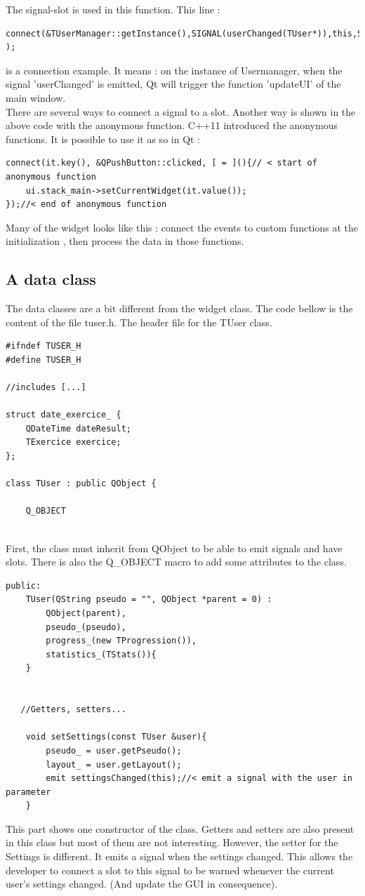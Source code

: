 The signal-slot is used in this function. This line : 
\begin{lstlisting}
connect(&TUserManager::getInstance(),SIGNAL(userChanged(TUser*)),this,SLOT(updateUI(TUser*)) );
\end{lstlisting}
is a connection example. It means : on the instance of Usermanager, when the signal 'userChanged' is emitted, Qt will trigger the function 'updateUI' of the main window.\\
There are several ways to connect a signal to a slot. Another way is shown in the above code with the anonymous function. C++11 introduced the anonymous functions. It is possible to use it as so in Qt :
\begin{lstlisting}
connect(it.key(), &QPushButton::clicked, [ = ](){// < start of anonymous function
	ui.stack_main->setCurrentWidget(it.value());
});//< end of anonymous function
\end{lstlisting}

Many of the widget looks like this : connect the events to custom functions at the initialization , then process the data in those functions.

\subsection{A data class}

The data classes are a bit different from the widget class. The code bellow is the content of the file tuser.h. The header file for the TUser class.
\begin{lstlisting}
#ifndef TUSER_H
#define TUSER_H

//includes [...]

struct date_exercice_ {
    QDateTime dateResult;
    TExercice exercice;
};

class TUser : public QObject {

    Q_OBJECT
    
\end{lstlisting}
First, the class must inherit from QObject to be able to emit signals and have slots. There is also the Q\_OBJECT macro to add some attributes to the class.

\begin{lstlisting}
public:
    TUser(QString pseudo = "", QObject *parent = 0) :
        QObject(parent),
        pseudo_(pseudo),
        progress_(new TProgression()),
        statistics_(TStats()){
    }


   //Getters, setters...

    void setSettings(const TUser &user){
        pseudo_ = user.getPseudo();
        layout_ = user.getLayout();
        emit settingsChanged(this);//< emit a signal with the user in parameter
    }
\end{lstlisting}
This part shows one constructor of the class. Getters and setters are also present in this class but most of them are not interesting. However, the setter for the Settings is different. It emits a signal when the settings changed. This allows the developer to connect a slot to this signal to be warned whenever the current user's settings changed. (And update the GUI in consequence).


